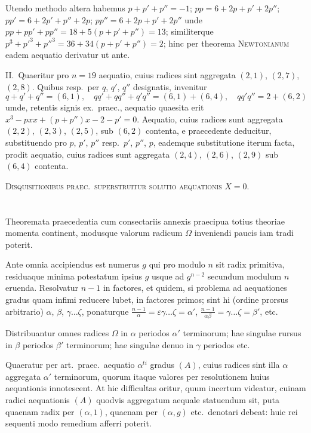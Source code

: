 \documentclass[12pt,a4paper]{article}
\theoremstyle{plain}
\theoremstyle{definition}
\theoremstyle{remark}
\begin{document}
Utendo methodo altera habemus $p+p'+p''=-1$; $pp=6+2p+p'+2p''$; $pp'=6+2p'+p''+2p$; $pp''=6+2p+p'+2p''$ unde $pp+pp'+pp''=18+5(p+p'+p'')=13$; similiterque $p^3+p'^3+p''^3=36+34(p+p'+p'')=2$; hinc per theorema \textsc{Newtonianum} eadem aequatio derivatur ut ante.

\textsc{II.}\ Quaeritur pro $n=19$ aequatio, cuius radices sint aggregata $(2,1)$, $(2,7)$, $(2,8)$. Quibus resp.\ per $q$, $q'$, $q''$ designatis, invenitur
\[q+q'+q''=(6,1),\quad qq'+qq''+q'q''=(6,1)+(6,4),\quad qq'q''=2+(6,2)\]
umde, retentis signis ex.\ praec., aequatio quaesita erit $x^3-pxx+(p+p'')x-2-p'=0$. Aequatio, cuius radices sunt aggregata $(2,2)$, $(2,3)$, $(2,5)$, sub $(6,2)$ contenta, e praecedente deducitur, substituendo pro $p$, $p'$, $p''$ resp.\ $p'$, $p''$, $p$, eademque substitutione iterum facta, prodit aequatio, cuius radices sunt aggregata $(2,4)$, $(2,6)$, $(2,9)$ sub $(6,4)$ contenta.

\bigskip
\noindent\textsc{Disquisitionibus praec.\ superstruitur solutio aequationis $X=0$.}

\section{}

Theoremata praecedentia cum consectariis annexis praecipua totius theoriae momenta continent, modusque valorum radicum $\Omega$ inveniendi paucis iam tradi poterit.

Ante omnia accipiendus est numerus $g$ qui pro modulo $n$ sit radix primitiva, residuaque minima potestatum ipsius $g$ usque ad $g^{n-2}$ secundum modulum $n$ eruenda. Resolvatur $n-1$ in factores, et quidem, si problema ad aequationes gradus quam infimi reducere lubet, in factores primos; sint hi (ordine prorsus arbitrario) $\alpha$, $\beta$, $\gamma\ldots\zeta$, ponaturque $\frac{n-1}{\alpha}=\varepsilon\gamma\ldots\zeta=\alpha'$, $\frac{n-1}{\alpha\beta}=\gamma\ldots\zeta=\beta'$, etc.

Distribuantur omnes radices $\Omega$ in $\alpha$ periodos $\alpha'$ terminorum; hae singulae rursus in $\beta$ periodos $\beta'$ terminorum; hae singulae denuo in $\gamma$ periodos etc.

Quaeratur per art.\ praec.\ aequatio $\alpha^{ti}$ gradus $(A)$, cuius radices sint illa $\alpha$ aggregata $\alpha'$ terminorum, quorum itaque valores per resolutionem huius aequationis innotescent. At hic difficultas oritur, quum incertum videatur, cuinam radici aequationis $(A)$ quodvis aggregatum aequale statuendum sit, puta quaenam radix per $(\alpha,1)$, quaenam per $(\alpha,g)$ etc.\ denotari debeat: huic rei sequenti modo remedium afferri poterit.
\end{document}
